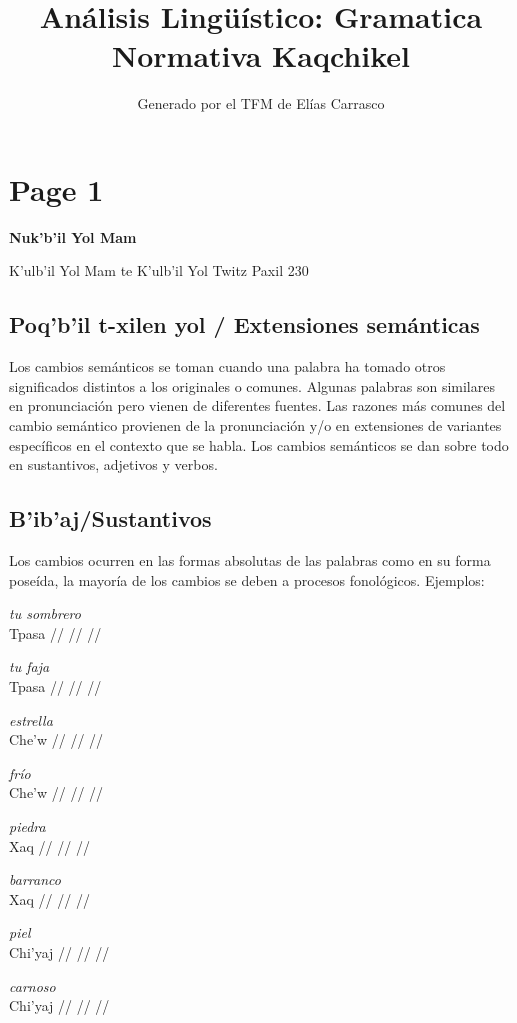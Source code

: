 \documentclass{article}%
\title{Análisis Lingüístico: Gramatica Normativa Kaqchikel}%
\author{Generado por el TFM de Elías Carrasco}%
\begin{document}
%
\normalsize%
\maketitle%
\section{Page 1}%
\label{sec:Page1}%
\centerline{\textbf{Nuk’b’il Yol Mam}}%
K’ulb’il Yol Mam te K’ulb’il Yol Twitz Paxil 230 %
\subsection{Poq’b’il t{-}xilen yol / Extensiones semánticas}%
\label{subsec:Poqbilt{-}xilenyol/Extensionessemnticas}%

%
Los cambios semánticos se toman cuando una palabra ha tomado otros significados distintos a los originales o comunes. %
Algunas palabras son similares en pronunciación pero vienen de diferentes fuentes. %
Las razones más comunes del cambio semántico provienen de la pronunciación y/o en extensiones de variantes específicos en el contexto que se habla. %
Los cambios semánticos se dan sobre todo en sustantivos, adjetivos y verbos. %
\subsection{B’ib’aj/Sustantivos}%
\label{subsec:Bibaj/Sustantivos}%

%
Los cambios ocurren en las formas absolutas de las palabras como en su forma poseída, la mayoría de los cambios se deben a procesos fonológicos. %
Ejemplos: %
\par\medskip%
\ex
\textit{tu sombrero} \\
\begingl
\gla Tpasa //
\glb  //
\glc  //
\endgl
\xe
%
\medskip%
\par\medskip%
\ex
\textit{tu faja} \\
\begingl
\gla Tpasa //
\glb  //
\glc  //
\endgl
\xe
%
\medskip%
\par\medskip%
\ex
\textit{estrella} \\
\begingl
\gla Che’w //
\glb  //
\glc  //
\endgl
\xe
%
\medskip%
\par\medskip%
\ex
\textit{frío} \\
\begingl
\gla Che’w //
\glb  //
\glc  //
\endgl
\xe
%
\medskip%
\par\medskip%
\ex
\textit{piedra} \\
\begingl
\gla Xaq //
\glb  //
\glc  //
\endgl
\xe
%
\medskip%
\par\medskip%
\ex
\textit{barranco} \\
\begingl
\gla Xaq //
\glb  //
\glc  //
\endgl
\xe
%
\medskip%
\par\medskip%
\ex
\textit{piel} \\
\begingl
\gla Chi’yaj //
\glb  //
\glc  //
\endgl
\xe
%
\medskip%
\par\medskip%
\ex
\textit{carnoso} \\
\begingl
\gla Chi’yaj //
\glb  //
\glc  //
\endgl
\xe
%
\medskip

%
\end{document}
